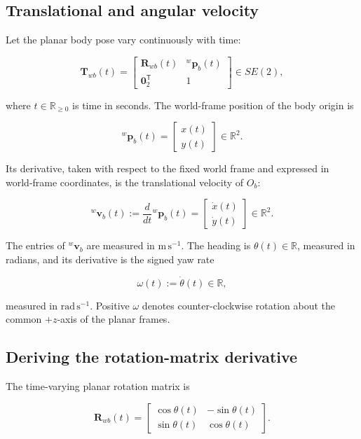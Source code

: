 \documentclass[
  australian,
  12pt,
  letterpaper,
  DIV=11,
  numbers=noendperiod,
  twoside]{scrreprt}
\begin{document}
\subsection{Translational and angular
velocity}\label{translational-and-angular-velocity}

Let the planar body pose vary continuously with time:

\[
\mathbf T_{wb}(t)
=
\begin{bmatrix}
\mathbf R_{wb}(t)&{}^{w}\mathbf p_b(t)\\
\mathbf 0_2^\mathsf T&1
\end{bmatrix}
\in SE(2),
\]

where \(t\in\mathbb R_{\geq0}\) is time in seconds. The world-frame
position of the body origin is

\[
{}^{w}\mathbf p_b(t)
=
\begin{bmatrix}
x(t)\\
y(t)
\end{bmatrix}
\in\mathbb R^2.
\]

Its derivative, taken with respect to the fixed world frame and
expressed in world-frame coordinates, is the translational velocity of
\(O_b\):

\[
\boxed{
{}^{w}\mathbf v_b(t)
\mathrel{:=}
\frac{d}{dt}{}^{w}\mathbf p_b(t)
=
\begin{bmatrix}
\dot x(t)\\
\dot y(t)
\end{bmatrix}
}
\in\mathbb R^2.
\]

The entries of \({}^{w}\mathbf v_b\) are measured in
\(\mathrm{m\,s^{-1}}\). The heading is \(\theta(t)\in\mathbb R\),
measured in radians, and its derivative is the signed yaw rate

\[
\boxed{
\omega(t)
\mathrel{:=}
\dot\theta(t)
}
\in\mathbb R,
\]

measured in \(\mathrm{rad\,s^{-1}}\). Positive \(\omega\) denotes
counter-clockwise rotation about the common \(+z\)-axis of the planar
frames.

\subsection{Deriving the rotation-matrix
derivative}\label{sec-se2-rotation-matrix-derivative}

The time-varying planar rotation matrix is

\[
\mathbf R_{wb}(t)
=
\begin{bmatrix}
\cos\theta(t)&-\sin\theta(t)\\
\sin\theta(t)&\cos\theta(t)
\end{bmatrix}.
\]
\end{document}
